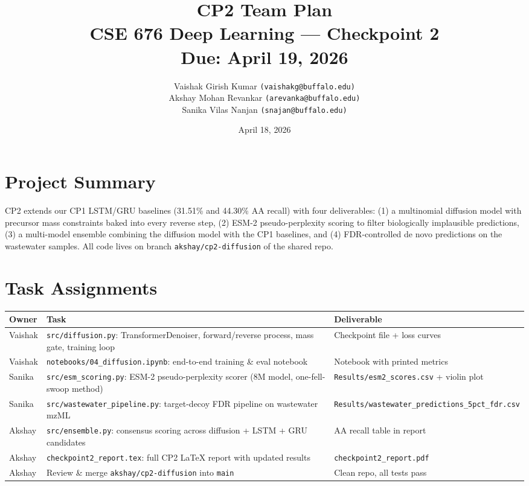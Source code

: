 \documentclass[11pt,letterpaper]{article}
\title{\textbf{CP2 Team Plan}\\
\large CSE 676 Deep Learning --- Checkpoint 2\\
\normalsize Due: April 19, 2026}
\author{
  Vaishak Girish Kumar \texttt{(vaishakg@buffalo.edu)}\\
  Akshay Mohan Revankar \texttt{(arevanka@buffalo.edu)}\\
  Sanika Vilas Nanjan \texttt{(snajan@buffalo.edu)}
}
\date{April 18, 2026}
\begin{document}
\maketitle
\tableofcontents
\newpage

\section{Project Summary}

CP2 extends our CP1 LSTM/GRU baselines (31.51\% and 44.30\% AA recall) with four deliverables:
(1) a multinomial diffusion model with precursor mass constraints baked into every reverse step,
(2) ESM-2 pseudo-perplexity scoring to filter biologically implausible predictions,
(3) a multi-model ensemble combining the diffusion model with the CP1 baselines,
and (4) FDR-controlled de novo predictions on the wastewater samples.
All code lives on branch \texttt{akshay/cp2-diffusion} of the shared repo.

\section{Task Assignments}

\begin{center}
\begin{tabular}{p{2.2cm} p{5cm} p{4.5cm}}
\toprule
\textbf{Owner} & \textbf{Task} & \textbf{Deliverable} \\
\midrule
Vaishak &
  \texttt{src/diffusion.py}: TransformerDenoiser, forward/reverse process, mass gate, training loop &
  Checkpoint file + loss curves \\
\addlinespace
Vaishak &
  \texttt{notebooks/04\_diffusion.ipynb}: end-to-end training \& eval notebook &
  Notebook with printed metrics \\
\addlinespace
Sanika &
  \texttt{src/esm\_scoring.py}: ESM-2 pseudo-perplexity scorer (8M model, one-fell-swoop method) &
  \texttt{Results/esm2\_scores.csv} + violin plot \\
\addlinespace
Sanika &
  \texttt{src/wastewater\_pipeline.py}: target-decoy FDR pipeline on wastewater mzML &
  \texttt{Results/wastewater\_predictions\_5pct\_fdr.csv} \\
\addlinespace
Akshay &
  \texttt{src/ensemble.py}: consensus scoring across diffusion + LSTM + GRU candidates &
  AA recall table in report \\
\addlinespace
Akshay &
  \texttt{checkpoint2\_report.tex}: full CP2 LaTeX report with updated results &
  \texttt{checkpoint2\_report.pdf} \\
\addlinespace
Akshay &
  Review \& merge \texttt{akshay/cp2-diffusion} into \texttt{main} &
  Clean repo, all tests pass \\
\bottomrule
\end{tabular}
\end{center}
\end{document}
